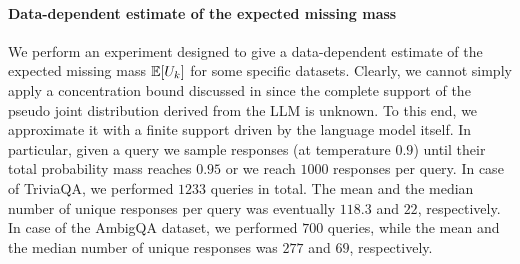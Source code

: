 \paragraph{Data-dependent estimate of the expected missing mass}
\label{sec:missing-mass-data-dependent}
%
We perform an experiment designed to give a data-dependent estimate of the expected missing mass $\mathbb{E}[U_k]$ for some specific datasets.
Clearly, we cannot simply apply a concentration bound discussed in  since the complete support of the pseudo joint distribution derived from the LLM is unknown.
To this end, we approximate it with a finite support driven by the language model itself.
In particular, given a query we sample responses (at temperature $0.9$) until their total probability mass reaches $0.95$ or we reach $1000$ responses per query.
In case of TriviaQA, we performed $1233$ queries in total.
The mean and the median number of unique responses per query was eventually $118.3$ and $22$, respectively.
In case of the AmbigQA dataset, we performed $700$ queries, while the mean and the median number of unique responses
was $277$ and $69$, respectively.

